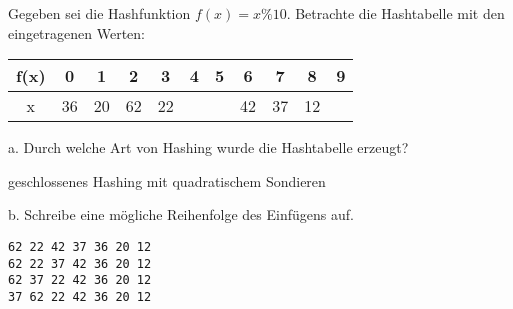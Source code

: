 
\renewcommand{\arraystretch}{2.0}
\setlength{\tabcolsep}{14pt}
\question[5]
Gegeben sei die Hashfunktion $f(x) = x \% 10$.
Betrachte die Hashtabelle mit den eingetragenen Werten:

\begin{tabular}{|c|c|c|c|c|c|c|c|c|c|c|}
\hline f(x) & 0 & 1 & 2 & 3 & 4 & 5 & 6 & 7 & 8 & 9 \\
\hline x     & 36 & 20 & 62 & 22 &   &    & 42 & 37 & 12 & \\
\hline
\end{tabular}

a. Durch welche Art von Hashing wurde die Hashtabelle erzeugt?
\begin{solutionbox}{1cm}
geschlossenes Hashing mit quadratischem Sondieren
\end{solutionbox}

b. Schreibe eine mögliche Reihenfolge des Einfügens auf.
\begin{solutionbox}{3cm}
\begin{lstlisting}
62 22 42 37 36 20 12
62 22 37 42 36 20 12
62 37 22 42 36 20 12
37 62 22 42 36 20 12
\end{lstlisting}
\end{solutionbox}
